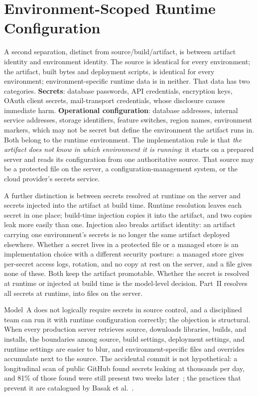 \documentclass[11pt]{article}
\begin{document}
\section{Environment-Scoped Runtime Configuration}

A second separation, distinct from source/build/artifact, is between artifact identity and environment identity. The source is identical for every environment; the artifact, built bytes and deployment scripts, is identical for every environment; environment-specific runtime data is in neither. That data has two categories. \textbf{Secrets}: database passwords, API credentials, encryption keys, OAuth client secrets, mail-transport credentials, whose disclosure causes immediate harm. \textbf{Operational configuration}: database addresses, internal service addresses, storage identifiers, feature switches, region names, environment markers, which may not be secret but define the environment the artifact runs in. Both belong to the runtime environment. The implementation rule is that \emph{the artifact does not know in which environment it is running}: it starts on a prepared server and reads its configuration from one authoritative source. That source may be a protected file on the server, a configuration-management system, or the cloud provider's secrets service.

A further distinction is between secrets resolved at runtime on the server and secrets injected into the artifact at build time. Runtime resolution leaves each secret in one place; build-time injection copies it into the artifact, and two copies leak more easily than one. Injection also breaks artifact identity: an artifact carrying one environment's secrets is no longer the same artifact deployed elsewhere. Whether a secret lives in a protected file or a managed store is an implementation choice with a different security posture: a managed store gives per-secret access logs, rotation, and no copy at rest on the server, and a file gives none of these. Both keep the artifact promotable. Whether the secret is resolved at runtime or injected at build time is the model-level decision. Part~II resolves all secrets at runtime, into files on the server.

Model~A does not logically require secrets in source control, and a disciplined team can run it with runtime configuration correctly; the objection is structural. When every production server retrieves source, downloads libraries, builds, and installs, the boundaries among source, build settings, deployment settings, and runtime settings are easier to blur, and environment-specific files and overrides accumulate next to the source. The accidental commit is not hypothetical: a longitudinal scan of public GitHub found secrets leaking at thousands per day, and 81\% of those found were still present two weeks later~\cite{Meli}; the practices that prevent it are catalogued by Basak et al.~\cite{Basak}.
\end{document}

